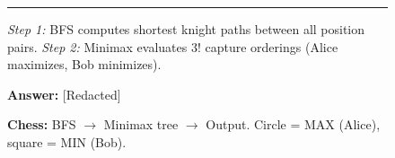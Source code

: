 \documentclass{article}
\begin{document}
\begin{figure}[t]
\begin{tcolorbox}
\begin{minipage}[c]{0.76\textwidth}
    \end{minipage}

    \vspace{0.05cm}
    \hrule
    \vspace{0.08cm}

    {\footnotesize
    \textit{Step 1:} BFS computes shortest knight paths between all position pairs.
    \textit{Step 2:} Minimax evaluates $3!$ capture orderings (Alice maximizes, Bob minimizes).
    }

    \vspace{0.1cm}
    \hfill \textbf{Answer:} [Redacted]
    \end{tcolorbox}

    \caption{\textbf{Chess:} \colorbox{orange!10}{BFS} $\to$ \colorbox{orange!22}{Minimax tree} $\to$ \colorbox{orange!45}{Output}. Circle = MAX (Alice), square = MIN (Bob).}
\end{figure}
\end{document}
